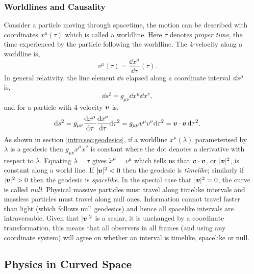\subsubsection{Worldlines and Causality}
Consider a particle moving through spacetime, the motion can be described with coordinates $x^\mu(\tau)$ which is called a worldline. Here $\tau$ denotes {\it proper time}, the time experienced by the particle following the worldline. The 4-velocity along a worldline is, 
\begin{equation}
v^\mu(\tau) = \frac{\dd x^\mu}{\dd \tau}(\tau).
\end{equation}
In general relativity, the line element $\dd s$ elapsed along a coordinate interval $\dd x^\mu$ is,
\begin{equation}
\dd s ^2 = g_{\mu\nu}\dd x^\mu \dd x^\nu,
\end{equation}
and for a particle with 4-velocity $\boldsymbol{v}$ is,
\begin{equation}
\dd s ^2 = g_{\mu\nu} \frac{\dd x^\mu}{\dd \tau}  \frac{\dd x^\nu}{\dd \tau} \dd \tau^2 = g_{\mu\nu} v^\mu v^\nu \dd \tau^2 = \boldsymbol{v} \cdot \boldsymbol{v} \,\dd \tau^2. 
\end{equation}
As shown in section \ref{intro:sec:geodesics}, if a worldline $x^\mu(\lambda)$ parameterised by $\lambda$ is a geodesic then $g_{\mu\nu} \dot{x}^\mu \dot{x}^\nu$ is constant where the dot denotes a derivative with respect to $\lambda$. Equating $\lambda=\tau$ gives $\dot{x}^\mu = v^\mu$ which tells us that $\boldsymbol{v} \cdot \boldsymbol{v}$, or $|\boldsymbol{v}|^2$, is constant along a world line. If $|\boldsymbol{v}|^2<0$ then the geodesic is {\it timelike}; similarly if $|\boldsymbol{v}|^2>0$ then the geodesic is {\it spacelike}. In the special case that $|\boldsymbol{v}|^2=0$, the curve is called {\it null}. Physical massive particles must travel along timelike intervals and massless particles must travel along null ones. Information cannot travel faster than light (which follows null geodesics) and hence all spacelike intervals are intraversable. Given that $|\boldsymbol{v}|^2$ is a scalar, it is unchanged by a coordinate transformation, this means that all observers in all frames (and using any coordinate system) will agree on whether an interval is timelike, spacelike or null.



\subsection{Physics in Curved Space} \label{intro:sec:curvedspacephysics}

